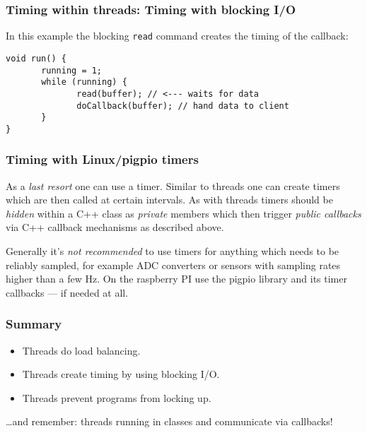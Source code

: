 \documentclass[xcolor=dvipsnames]{beamer}
\begin{document}
\begin{frame}[fragile]
\frametitle{Timing within threads: Timing with blocking I/O}

In this example the blocking \texttt{read} command creates
the timing of the callback:
\begin{verbatim}
void run() {
       running = 1;
       while (running) {
              read(buffer); // <--- waits for data
              doCallback(buffer); // hand data to client
       }
}
\end{verbatim}
\end{frame}

\begin{frame}[fragile]
\frametitle{Timing with Linux/pigpio timers}
As a \textsl{last resort} one can use a timer. Similar to threads one can
create timers which are then called at certain intervals. As with threads
timers should be \textsl{hidden} within a C++ class as
\textsl{private} members which then trigger \textsl{public callbacks}
via C++ callback mechanisms as described above.

Generally it's \textsl{not recommended}
to use timers for anything which needs to be reliably sampled, for
example ADC converters or sensors with sampling rates higher than a
few Hz. On the raspberry PI use the pigpio library and its timer
callbacks --- if needed at all.
\end{frame}

\begin{frame}[fragile]
  \frametitle{Summary}
  \begin{itemize}
  \item Threads do load balancing.
  \item Threads create timing by using blocking I/O.
  \item Threads prevent programs from locking up.
  \end{itemize}
  \ldots and remember: threads running in classes and communicate
  via callbacks!
\end{frame}
\end{document}
